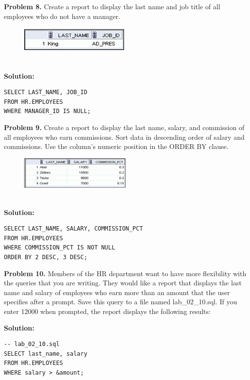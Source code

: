 \documentclass[12pt,a4paper]{article}
\begin{document}
\vspace{0.5cm}

\textbf{Problem 8.} Create a report to display the last name and job title of all employees who do not have a manager.
\begin{figure}[htbp]
  \centering
  \includegraphics[width=0.5\textwidth]{Screenshots/28.png}
\end{figure}\\
\textbf{Solution:}
\begin{lstlisting}[style=sqlstyle]
SELECT LAST_NAME, JOB_ID
FROM HR.EMPLOYEES
WHERE MANAGER_ID IS NULL;
\end{lstlisting}

\vspace{0.5cm}

\textbf{Problem 9.} Create a report to display the last name, salary, and commission of all employees who earn commissions. Sort data in descending order of salary and commissions. Use the column's numeric position in the ORDER BY clause.
\begin{figure}[htbp]
  \centering
  \includegraphics[width=0.5\textwidth]{Screenshots/29.png}
\end{figure}\\
\textbf{Solution:}
\begin{lstlisting}[style=sqlstyle]
SELECT LAST_NAME, SALARY, COMMISSION_PCT
FROM HR.EMPLOYEES
WHERE COMMISSION_PCT IS NOT NULL
ORDER BY 2 DESC, 3 DESC;
\end{lstlisting}

\vspace{0.5cm}

\textbf{Problem 10.} Members of the HR department want to have more flexibility with the queries that you are writing. They would like a report that displays the last name and salary of employees who earn more than an amount that the user specifies after a prompt. Save this query to a file named lab\_02\_10.sql. If you enter 12000 when prompted, the report displays the following results:

\textbf{Solution:}
\begin{lstlisting}[style=sqlstyle]
-- lab_02_10.sql
SELECT last_name, salary
FROM HR.EMPLOYEES
WHERE salary > &amount;
\end{lstlisting}
\end{document}
